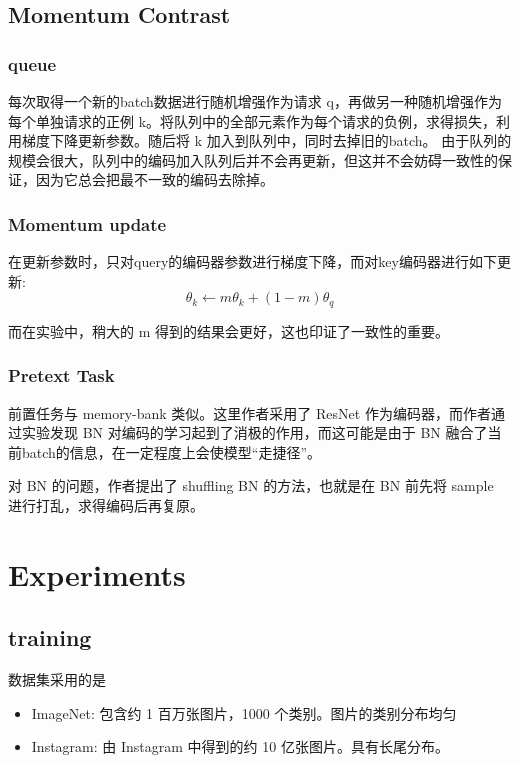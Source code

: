 \subsection{Momentum Contrast}
\subsubsection{queue}

每次取得一个新的batch数据进行随机增强作为请求 q，再做另一种随机增强作为每个单独请求的正例 k。将队列中的全部元素作为每个请求的负例，求得损失，利用梯度下降更新参数。随后将 k 加入到队列中，同时去掉旧的batch。
由于队列的规模会很大，队列中的编码加入队列后并不会再更新，但这并不会妨碍一致性的保证，因为它总会把最不一致的编码去除掉。

\subsubsection{Momentum update}

在更新参数时，只对query的编码器参数进行梯度下降，而对key编码器进行如下更新:
$$
\theta_k \leftarrow m\theta_k+(1-m)\theta_q
$$

而在实验中，稍大的 m 得到的结果会更好，这也印证了一致性的重要。

\subsubsection{Pretext Task}

前置任务与 memory-bank 类似。这里作者采用了 ResNet 作为编码器，而作者通过实验发现 BN 对编码的学习起到了消极的作用，而这可能是由于 BN 融合了当前batch的信息，在一定程度上会使模型“走捷径”。

对 BN 的问题，作者提出了 shuffling BN 的方法，也就是在 BN 前先将 sample 进行打乱，求得编码后再复原。

\section{Experiments}

\subsection{training}

数据集采用的是 
\begin{itemize}
	\item ImageNet: 包含约 1 百万张图片，1000 个类别。图片的类别分布均匀
	\item Instagram: 由 Instagram 中得到的约 10 亿张图片。具有长尾分布。
\end{itemize}

